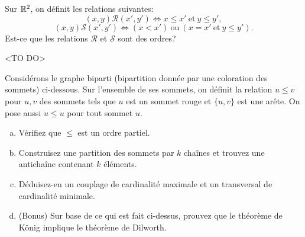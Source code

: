 \begin{exo}
Sur $\mathbb{R}^2$, on d\'efinit les relations suivantes:
$$(x,y)\mathcal{R}(x',y') \Leftrightarrow x \leq x' \mathrm{~et~} y \leq y', $$
$$(x,y)\mathcal{S}(x',y') \Leftrightarrow (x < x') \mathrm{~ou~} (x = x' \mathrm{~et~} y \leq y').$$
Est-ce que les relations $\mathcal{R}$ et $\mathcal{S}$ sont des ordres?
\end{exo}

<TO DO>


\begin{exo}
Consid\'erons le graphe biparti (bipartition donn\'ee par une coloration des sommets) ci-dessous. Sur l'ensemble de ses sommets, on d\'efinit la relation $u\leq v$ pour $u,v$ des sommets tels que $u$ est un sommet rouge et $\{u,v\}$ est une ar\^ete. On pose aussi $u\leq u$ pour tout sommet $u$. \\
\begin{enumerate}[(a)]
\item V\'erifiez que $\leq$ est un ordre partiel.
\item Construisez une partition des sommets par $k$ cha\^ines et trouvez une anticha\^ine contenant $k$ \'el\'ements.
\item D\'eduisez-en un couplage de cardinalit\'e maximale et un transversal de cardinalit\'e minimale. 
\item (Bonus) Sur base de ce qui est fait ci-dessus, prouvez que le th\'eor\`eme de K\"onig implique le th\'eor\`eme de Dilworth.
\end{enumerate}
\end{exo}

\begin{figure}[!h]
\begin{center}

\end{center}
\caption{}
\end{figure}

